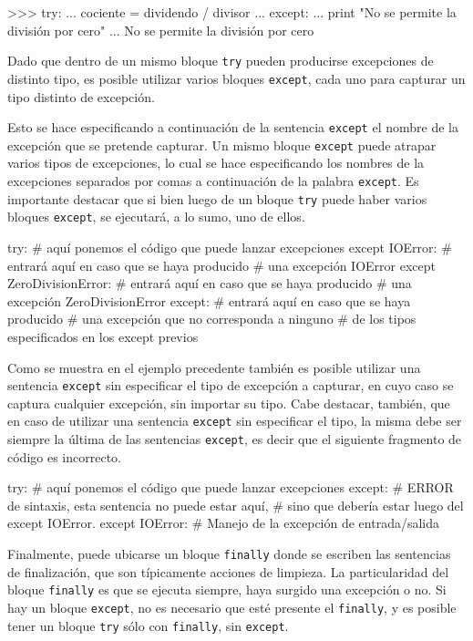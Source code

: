 \begin{codigo-python-sn}
>>> try:
...     cociente = dividendo / divisor
... except:
...     print "No se permite la división por cero"
...
No se permite la división por cero
\end{codigo-python-sn}

Dado que dentro de un mismo bloque \lstinline!try! pueden producirse
excepciones de distinto tipo, es posible utilizar varios bloques
\lstinline!except!, cada uno para capturar un tipo distinto de excepción.

Esto se hace especificando a continuación de la sentencia
\lstinline!except! el nombre de la excepción que se pretende capturar. Un
mismo bloque \lstinline!except! puede atrapar varios tipos de excepciones,
lo cual se hace especificando los nombres de la excepciones separados por
comas a continuación de la palabra \lstinline!except!. Es importante
destacar que si bien luego de un bloque \lstinline!try! puede haber varios
bloques \lstinline!except!, se ejecutará, a lo sumo, uno de ellos.

\begin{codigo-python-sn}
try:
	# aquí ponemos el código que puede lanzar excepciones
except IOError:
	# entrará aquí en caso que se haya producido
	# una excepción IOError
except ZeroDivisionError:
	# entrará aquí en caso que se haya producido
	# una excepción ZeroDivisionError
except:
	# entrará aquí en caso que se haya producido
	# una excepción que no corresponda a ninguno
	# de los tipos especificados en los except previos
\end{codigo-python-sn}

Como se muestra en el ejemplo precedente también es posible utilizar una
sentencia \lstinline!except! sin especificar el tipo de excepción a
capturar, en cuyo caso se captura cualquier excepción, sin importar su
tipo. Cabe destacar, también, que en caso de utilizar una sentencia
\lstinline!except! sin especificar el tipo, la misma debe ser siempre la
última de las sentencias \lstinline!except!, es decir que el siguiente
fragmento de código es incorrecto.

\begin{codigo-python-sn}[numbers=none]
try:
	# aquí ponemos el código que puede lanzar excepciones
except:
	# ERROR de sintaxis, esta sentencia no puede estar aquí,
	# sino que debería estar luego del except IOError.
except IOError:
	# Manejo de la excepción de entrada/salida
\end{codigo-python-sn}

Finalmente, puede ubicarse un bloque \lstinline!finally! donde se escriben
las sentencias de finalización, que son típicamente acciones de limpieza.
La particularidad del bloque \lstinline!finally! es que se ejecuta siempre,
haya surgido una excepción o no. Si hay un bloque \lstinline!except!, no es
necesario que esté presente el \lstinline!finally!, y es posible tener un
bloque \lstinline!try! sólo con \lstinline!finally!, sin
\lstinline!except!. \\

